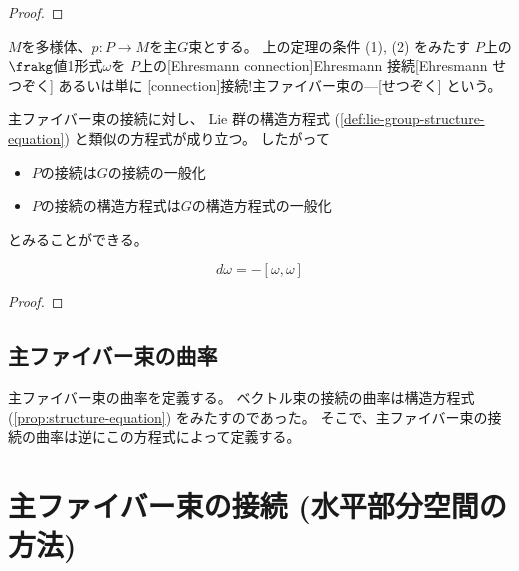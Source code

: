 \documentclass[report]{jlreq}
\begin{document}
\begin{proof}
    \TODO{}
\end{proof}

\begin{definition}[Ehresmann 接続]
    $M$を多様体、$p \colon P \to M$を主$G$束とする。
    上の定理の条件 (1), (2) をみたす
    $P$上の$\frakg$値1形式$\omega$を
    $P$上の[Ehresmann connection]{Ehresmann 接続}[Ehresmann せつぞく]
    あるいは単に
    [connection]{接続!主ファイバー束の---}[せつぞく]
    という。
\end{definition}

主ファイバー束の接続に対し、
Lie 群の構造方程式
(\cref{def:lie-group-structure-equation})
と類似の方程式が成り立つ。
したがって
\begin{itemize}
    \item $P$の接続は$G$の接続の一般化
    \item $P$の接続の構造方程式は$G$の構造方程式の一般化
\end{itemize}
とみることができる。

\begin{proposition}[接続の構造方程式]
    \begin{equation}
        d\omega = - [\omega, \omega]
    \end{equation}
    \TODO{}
\end{proposition}

\begin{proof}
    \TODO{}
\end{proof}

\subsection{主ファイバー束の曲率}

主ファイバー束の曲率を定義する。
ベクトル束の接続の曲率は構造方程式 (\cref{prop:structure-equation})
をみたすのであった。
そこで、主ファイバー束の接続の曲率は逆にこの方程式によって定義する。

\begin{definition}[曲率形式]
    \TODO{}
\end{definition}

%
\section{主ファイバー束の接続 (水平部分空間の方法)}
\end{document}
